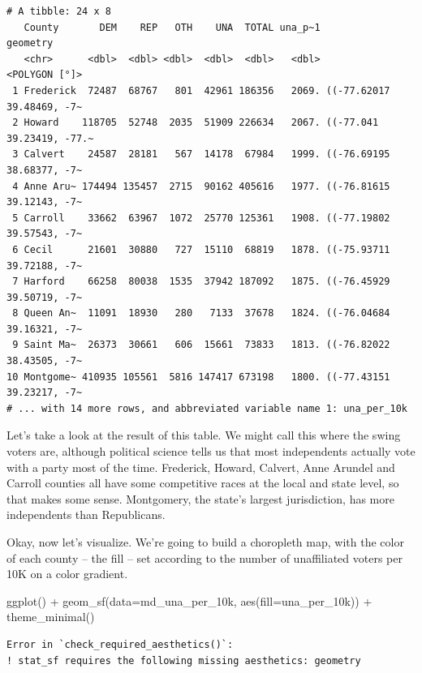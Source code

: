 \documentclass[
  letterpaper,
  DIV=11,
  numbers=noendperiod]{scrreprt}
\newenvironment{Shaded}{\begin{snugshade}}{\end{snugshade}}
\newcommand{\AttributeTok}[1]{\textcolor[rgb]{0.40,0.45,0.13}{#1}}
\newcommand{\FunctionTok}[1]{\textcolor[rgb]{0.28,0.35,0.67}{#1}}
\newcommand{\NormalTok}[1]{\textcolor[rgb]{0.00,0.23,0.31}{#1}}
\newcommand{\SpecialCharTok}[1]{\textcolor[rgb]{0.37,0.37,0.37}{#1}}
\begin{document}
\begin{verbatim}
# A tibble: 24 x 8
   County       DEM    REP   OTH    UNA  TOTAL una_p~1                  geometry
   <chr>      <dbl>  <dbl> <dbl>  <dbl>  <dbl>   <dbl>             <POLYGON [°]>
 1 Frederick  72487  68767   801  42961 186356   2069. ((-77.62017 39.48469, -7~
 2 Howard    118705  52748  2035  51909 226634   2067. ((-77.041 39.23419, -77.~
 3 Calvert    24587  28181   567  14178  67984   1999. ((-76.69195 38.68377, -7~
 4 Anne Aru~ 174494 135457  2715  90162 405616   1977. ((-76.81615 39.12143, -7~
 5 Carroll    33662  63967  1072  25770 125361   1908. ((-77.19802 39.57543, -7~
 6 Cecil      21601  30880   727  15110  68819   1878. ((-75.93711 39.72188, -7~
 7 Harford    66258  80038  1535  37942 187092   1875. ((-76.45929 39.50719, -7~
 8 Queen An~  11091  18930   280   7133  37678   1824. ((-76.04684 39.16321, -7~
 9 Saint Ma~  26373  30661   606  15661  73833   1813. ((-76.82022 38.43505, -7~
10 Montgome~ 410935 105561  5816 147417 673198   1800. ((-77.43151 39.23217, -7~
# ... with 14 more rows, and abbreviated variable name 1: una_per_10k
\end{verbatim}

Let's take a look at the result of this table. We might call this where
the swing voters are, although political science tells us that most
independents actually vote with a party most of the time. Frederick,
Howard, Calvert, Anne Arundel and Carroll counties all have some
competitive races at the local and state level, so that makes some
sense. Montgomery, the state's largest jurisdiction, has more
independents than Republicans.

Okay, now let's visualize. We're going to build a choropleth map, with
the color of each county -- the fill -- set according to the number of
unaffiliated voters per 10K on a color gradient.

\begin{Shaded}
\begin{Highlighting}[]
\FunctionTok{ggplot}\NormalTok{() }\SpecialCharTok{+}
  \FunctionTok{geom\_sf}\NormalTok{(}\AttributeTok{data=}\NormalTok{md\_una\_per\_10k, }\FunctionTok{aes}\NormalTok{(}\AttributeTok{fill=}\NormalTok{una\_per\_10k)) }\SpecialCharTok{+}
  \FunctionTok{theme\_minimal}\NormalTok{()}
\end{Highlighting}
\end{Shaded}

\begin{verbatim}
Error in `check_required_aesthetics()`:
! stat_sf requires the following missing aesthetics: geometry
\end{verbatim}
\end{document}
